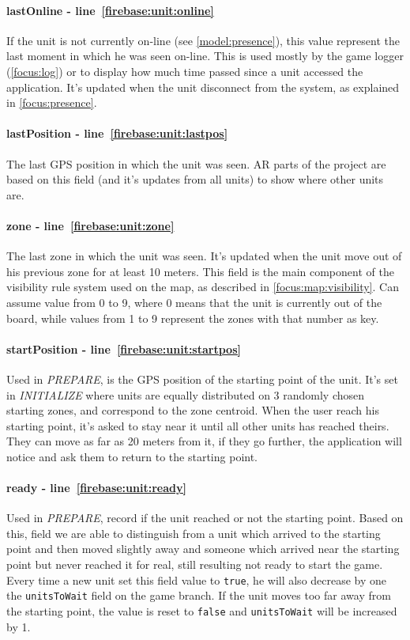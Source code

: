 				\paragraph{lastOnline - line~\ref{firebase:unit:online}}
				If the unit is not currently on-line (see \autoref{model:presence}), this value represent the last moment in which he was seen on-line. This is used mostly by the game logger (\autoref{focus:log}) or to display how much time passed since a unit accessed the application. It's updated when the unit disconnect from the system, as explained in \autoref{focus:presence}.
				
				\paragraph{lastPosition - line~\ref{firebase:unit:lastpos}}
				The last GPS position in which the unit was seen. AR parts of the project are based on this field (and it's updates from all units) to show where other units are.
			
				\paragraph{zone - line~\ref{firebase:unit:zone}}
				The last zone in which the unit was seen. It's updated when the unit move out of his previous zone for at least 10 meters. This field is the main component of the visibility rule system used on the map, as described in \autoref{focus:map:visibility}. Can assume value from 0 to 9, where 0 means that the unit is currently out of the board, while values from 1 to 9 represent the zones with that number as key.
				
				\paragraph{startPosition - line~\ref{firebase:unit:startpos}}
				Used in \emph{PREPARE}, is the GPS position of the starting point of the unit. It's set in \emph{INITIALIZE} where units are equally distributed on 3 randomly chosen starting zones, and correspond to the zone centroid.
				When the user reach his starting point, it's asked to stay near it until all other units has reached theirs. They can move as far as 20 meters from it, if they go further, the application will notice and ask them to return to the starting point.
				
				\paragraph{ready - line~\ref{firebase:unit:ready}}
				Used in \emph{PREPARE}, record if the unit reached or not the starting point. Based on this, field we are able to distinguish from a unit which arrived to the starting point and then moved slightly away and someone which arrived near the starting point but never reached it for real, still resulting not ready to start the game. Every time a new unit set this field value to \lstinline|true|, he will also decrease by one the \lstinline|unitsToWait| field on the game branch.
				If the unit moves too far away from the starting point, the value is reset to \lstinline|false| and \lstinline|unitsToWait| will be increased by 1. 
				
